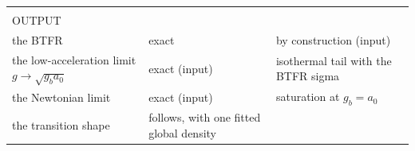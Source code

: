 \documentclass[
  10pt,
]{article}
\begin{document}
\begin{longtable}[]{@{}lll@{}}
\begin{minipage}[t]{0.50\columnwidth}
\end{minipage}\tabularnewline
\begin{minipage}[t]{0.24\columnwidth}\raggedright
OUTPUT\strut
\end{minipage} & \begin{minipage}[t]{0.20\columnwidth}\raggedright
\strut
\end{minipage} & \begin{minipage}[t]{0.50\columnwidth}\raggedright
\strut
\end{minipage}\tabularnewline
\begin{minipage}[t]{0.24\columnwidth}\raggedright
the BTFR\strut
\end{minipage} & \begin{minipage}[t]{0.20\columnwidth}\raggedright
exact\strut
\end{minipage} & \begin{minipage}[t]{0.50\columnwidth}\raggedright
by construction (input)\strut
\end{minipage}\tabularnewline
\begin{minipage}[t]{0.24\columnwidth}\raggedright
the low-acceleration limit $g\to\sqrt{g_b a_0}$\strut
\end{minipage} & \begin{minipage}[t]{0.20\columnwidth}\raggedright
exact (input)\strut
\end{minipage} & \begin{minipage}[t]{0.50\columnwidth}\raggedright
isothermal tail with the BTFR sigma\strut
\end{minipage}\tabularnewline
\begin{minipage}[t]{0.24\columnwidth}\raggedright
the Newtonian limit\strut
\end{minipage} & \begin{minipage}[t]{0.20\columnwidth}\raggedright
exact (input)\strut
\end{minipage} & \begin{minipage}[t]{0.50\columnwidth}\raggedright
saturation at $g_b=a_0$\strut
\end{minipage}\tabularnewline
\begin{minipage}[t]{0.24\columnwidth}\raggedright
the transition shape\strut
\end{minipage} & \begin{minipage}[t]{0.20\columnwidth}\raggedright
follows, with one fitted global density\strut
\end{minipage} & \begin{minipage}[t]{0.50\columnwidth}\raggedright

\end{minipage}
\end{longtable}
\end{document}
